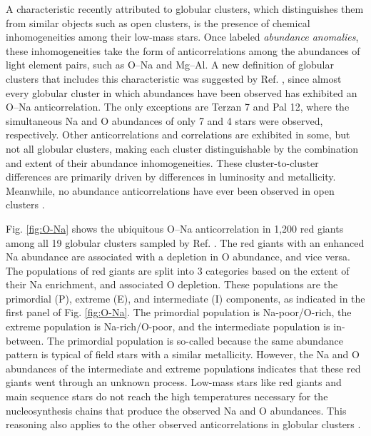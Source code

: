 A characteristic recently attributed to globular clusters, which distinguishes them from similar objects such as open clusters, is the presence of chemical inhomogeneities among their low-mass stars. Once labeled \emph{abundance anomalies}, these inhomogeneities take the form of anticorrelations among the abundances of light element pairs, such as O--Na and Mg--Al. A new definition of globular clusters that includes this characteristic was suggested by Ref. \cite{Carretta2010}, since almost every globular cluster in which abundances have been observed has exhibited an O--Na anticorrelation. 
The only exceptions are Terzan 7 and Pal 12, where the simultaneous Na and O abundances of only 7 \cite{Sbordone2007} and 4 \cite{Cohen2004} stars were observed, respectively. Other anticorrelations and correlations are exhibited in some, but not all globular clusters, making each cluster distinguishable by the combination and extent of their abundance inhomogeneities. These cluster-to-cluster differences are primarily driven by differences in luminosity and metallicity. Meanwhile, no abundance anticorrelations have ever been observed in open clusters \cite{Gratton2019}.

Fig. \ref{fig:O-Na} shows the ubiquitous O--Na anticorrelation in 1,200 red giants among all 19 globular clusters sampled by Ref. \cite{Carretta2010}. The red giants with an enhanced Na abundance are associated with a depletion in O abundance, and vice versa. The populations of red giants are split into 3 categories based on the extent of their Na enrichment, and associated O depletion. These populations are the primordial (P), extreme (E), and intermediate (I) components, as indicated in the first panel of Fig. \ref{fig:O-Na}. The primordial population is Na-poor/O-rich, the extreme population is Na-rich/O-poor, and the intermediate population is in-between. The primordial population is so-called because the same abundance pattern is typical of field stars with a similar metallicity. However, the Na and O abundances of the intermediate and extreme populations indicates that these red giants went through an unknown process. Low-mass stars like red giants and main sequence stars do not reach the high temperatures necessary for the nucleosynthesis chains that produce the observed Na and O abundances. This reasoning also applies to the other observed anticorrelations in globular clusters \cite{Prantzos2007}.

